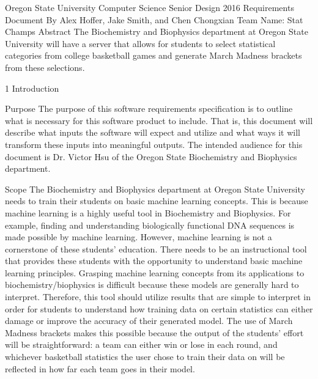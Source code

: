 \documentclass[letterpaper, 10pt,titlepage]{article}
\begin{document}
\begin{center}

Oregon State University Computer Science Senior Design 2016
\bigbreak
Requirements Document
\bigbreak
By Alex Hoffer, Jake Smith, and Chen Chongxian
\bigbreak
Team Name: Stat Champs
\bigbreak
\vspace{3.0cm}
 Abstract
\bigbreak
The Biochemistry and Biophysics department at Oregon State University will have a server that allows for students to select statistical categories from college basketball games and generate March Madness brackets from these selections.
\newpage
\end{center}

\tableofcontents

\newpage

\begin{section}{1 Introduction}


\begin{subsection}{Purpose}
The purpose of this software requirements specification is to outline what is necessary for this software product to include. That is, this document will describe what inputs the software will expect and utilize and what ways it will transform these inputs into meaningful outputs. The intended audience for this document is Dr. Victor Hsu of the Oregon State Biochemistry and Biophysics department.
\end{subsection}


\begin{subsection}{Scope}
The Biochemistry and Biophysics department at Oregon State University needs to train their students on basic machine learning concepts. This is because machine learning is a highly useful tool in Biochemistry and Biophysics. For example, finding and understanding biologically functional DNA sequences is made possible by machine learning. However, machine learning is not a cornerstone of these students’ education. There needs to be an instructional tool that provides these students with the opportunity to understand basic machine learning principles. Grasping machine learning concepts from its applications to biochemistry/biophysics is difficult because these models are generally hard to interpret. Therefore, this tool should utilize results that are simple to interpret in order for students to understand how training data on certain statistics can either damage or improve the accuracy of their generated model. The use of March Madness brackets makes this possible because the output of the students’ effort will be straightforward: a team can either win or lose in each round, and whichever basketball statistics the user chose to train their data on will be reflected in how far each team goes in their model.
\end{subsection}


\end{section}
\end{document}
